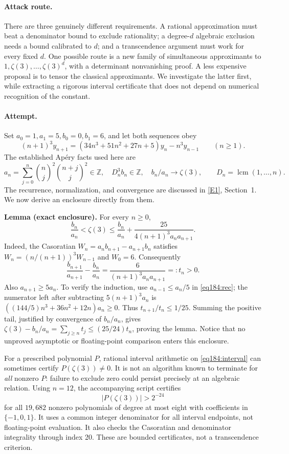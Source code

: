\documentclass[11pt,a4paper]{article}
\newcommand{\Z}{\mathbb{Z}}
\newcommand{\eref}[2]{\hyperlink{extra:#1:#2}{[E#2]}}
\numberwithin{equation}{section}
\begin{document}
\paragraph{Attack route.}
There are three genuinely different requirements. A rational approximation must beat a denominator bound to exclude rationality; a degree-$d$ algebraic exclusion needs a bound calibrated to $d$; and a transcendence argument must work for every fixed $d$. One possible route is a new family of simultaneous approximants to $1,\zeta(3),\ldots,\zeta(3)^d$, with a determinant nonvanishing proof. A less expensive proposal is to tensor the classical approximants. We investigate the latter first, while extracting a rigorous interval certificate that does not depend on numerical recognition of the constant.

\paragraph{Attempt.}
Set $a_0=1,a_1=5,b_0=0,b_1=6$, and let both sequences obey
\begin{equation}\label{eq184:rec}
(n+1)^3y_{n+1}=(34n^3+51n^2+27n+5)y_n-n^3y_{n-1}\qquad(n\ge1).
\end{equation}
The established Ap\'ery facts used here are
\[
 a_n=\sum_{j=0}^n\binom nj^2\binom{n+j}j^2\in\Z,
 \quad D_n^3b_n\in\Z,\quad b_n/a_n\longrightarrow\zeta(3),
 \qquad D_n=\operatorname{lcm}(1,\ldots,n).
\]
The recurrence, normalization, and convergence are discussed in \eref{184}{1}, Section~1. We now derive an enclosure directly from them.

\textbf{Lemma (exact enclosure).} For every $n\ge0$,
\begin{equation}\label{eq184:interval}
\frac{b_n}{a_n}<\zeta(3)
 \le \frac{b_n}{a_n}+\frac{25}{4(n+1)^3a_na_{n+1}}.
\end{equation}
Indeed, the Casoratian $W_n=a_nb_{n+1}-a_{n+1}b_n$ satisfies
$W_n=(n/(n+1))^3W_{n-1}$ and $W_0=6$. Consequently
\[
 \frac{b_{n+1}}{a_{n+1}}-\frac{b_n}{a_n}
 =\frac{6}{(n+1)^3a_na_{n+1}}=:t_n>0.
\]
Also $a_{n+1}\ge5a_n$. To verify the induction, use
$a_{n-1}\le a_n/5$ in \eqref{eq184:rec}; the numerator left after subtracting $5(n+1)^3a_n$ is
$((144/5)n^3+36n^2+12n)a_n\ge0$.
Thus $t_{n+1}/t_n\le1/25$. Summing the positive tail, justified by convergence of $b_n/a_n$, gives
$\zeta(3)-b_n/a_n=\sum_{j\ge n}t_j\le(25/24)t_n$, proving the lemma. Notice that no unproved asymptotic or floating-point comparison enters this enclosure.

For a prescribed polynomial $P$, rational interval arithmetic on \eqref{eq184:interval} can sometimes certify $P(\zeta(3))\ne0$. It is not an algorithm known to terminate for \emph{all} nonzero $P$: failure to exclude zero could persist precisely at an algebraic relation. Using $n=12$, the accompanying script certifies
\[
 |P(\zeta(3))|>2^{-24}
\]
for all $19{,}682$ nonzero polynomials of degree at most eight with
coefficients in $\{-1,0,1\}$. It uses a common integer denominator for
all interval endpoints, not floating-point evaluation. It also checks
the Casoratian and denominator integrality through index 20. These
are bounded certificates, not a transcendence criterion.
\end{document}
